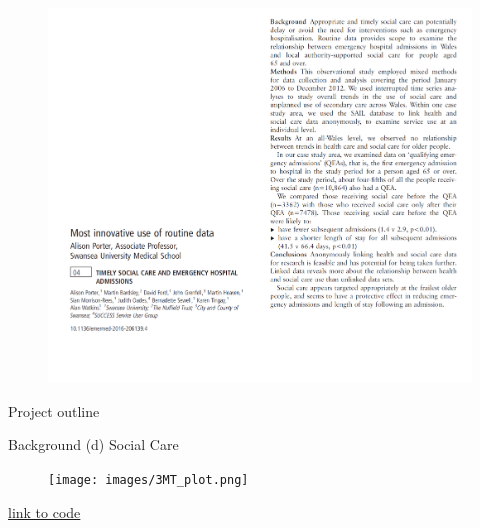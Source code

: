 \documentclass[ignorenonframetext,]{beamer}
\begin{document}
\begin{frame}{}

\begin{figure}
\centerline{\includegraphics{images/porter.png}}
\end{figure}

\end{frame}

\begin{frame}{Project outline}

\begin{block}{Background (d) Social Care}

\begin{figure}
\centerline{\texttt{[image: images/3MT\_plot.png]}}
\end{figure}

\faGithub\href{https://github.com/davidhen/social_care_open_data/blob/master/rmds/3MT_plot.Rmd}{ link to code}

\end{block}

\end{frame}
\end{document}
